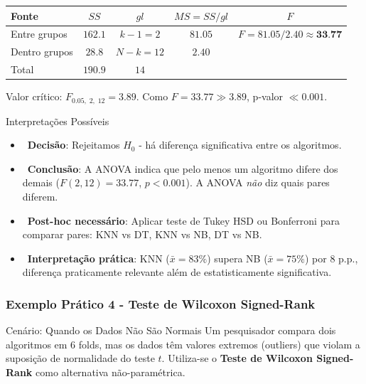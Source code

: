 \documentclass[12pt,a4paper]{article}
\begin{document}
\begin{center}
\begin{tabular}{lcccc}
\toprule
Fonte & $SS$ & $gl$ & $MS = SS/gl$ & $F$ \\
\midrule
Entre grupos & $162{.}1$ & $k-1=2$ & $81{.}05$ & $F = 81{.}05 / 2{.}40 \approx \mathbf{33{.}77}$ \\
Dentro grupos & $28{.}8$  & $N-k=12$ & $2{.}40$ & \\
Total & $190{.}9$ & $14$ & & \\
\bottomrule
\end{tabular}
\end{center}

Valor crítico: $F_{0{.}05,\;2,\;12} = 3{.}89$. Como $F = 33{.}77 \gg 3{.}89$, p-valor $\ll 0{.}001$.

\begin{exemplobox}{Interpretações Possíveis}
\begin{itemize}
  \item {}\ \textbf{Decisão}: Rejeitamos $H_0$ - há diferença significativa entre os algoritmos.
  \item {}\ \textbf{Conclusão}: A ANOVA indica que pelo menos um algoritmo difere dos demais ($F(2,12)=33{.}77$, $p<0{.}001$). A ANOVA \textit{não} diz quais pares diferem.
  \item {}\ \textbf{Post-hoc necessário}: Aplicar teste de Tukey HSD ou Bonferroni para comparar pares: KNN vs DT, KNN vs NB, DT vs NB.
  \item {}\ \textbf{Interpretação prática}: KNN ($\bar{x}=83\%$) supera NB ($\bar{x}=75\%$) por 8 p.p., diferença praticamente relevante além de estatisticamente significativa.
\end{itemize}
\end{exemplobox}

\subsubsection*{Exemplo Prático 4 - Teste de Wilcoxon Signed-Rank}

\begin{exemplobox}{Cenário: Quando os Dados Não São Normais}
Um pesquisador compara dois algoritmos em 6 folds, mas os dados têm valores extremos (outliers) que violam a suposição de normalidade do teste $t$. Utiliza-se o \textbf{Teste de Wilcoxon Signed-Rank} como alternativa não-paramétrica.
\end{exemplobox}
\end{document}
